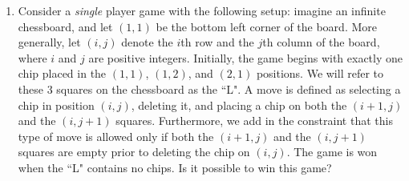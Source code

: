 \documentclass[10pt]{article}
\begin{document}
\begin{enumerate}

\item Consider a \emph{single} player game with the following setup: imagine an infinite chessboard, and let $(1,1)$ be the bottom left corner of the board.  More generally, let $(i,j)$ denote the $i$th row and the $j$th column of the board, where $i$ and $j$ are positive integers.  Initially, the game begins with exactly one chip placed in the $(1,1)$, $(1,2)$, and $(2,1)$ positions.  We will refer to these $3$ squares on the chessboard as the ``L".  A move is defined as selecting a chip in position $(i,j)$, deleting it, and placing a chip on both the $(i+1,j)$ and the $(i,j+1)$ squares.  Furthermore, we add in the constraint that this type of move is allowed only if both the $(i+1,j)$ and the $(i,j+1)$ squares are empty prior to deleting the chip on $(i,j)$.  The game is won when the ``L" contains no chips.  Is it possible to win this game?
\end{enumerate}
\end{document}
